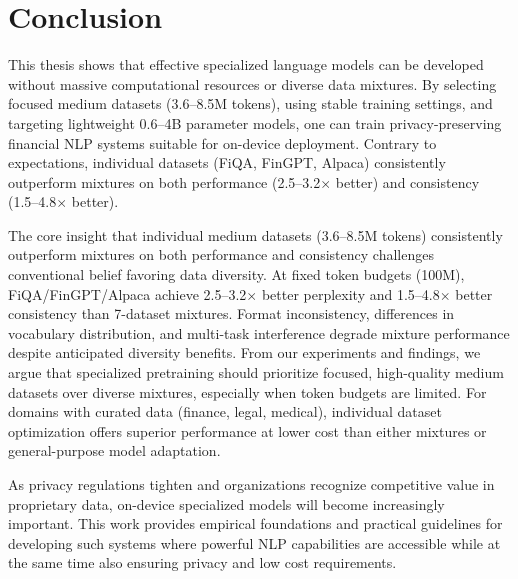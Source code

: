\chapter{Conclusion}


This thesis shows that effective specialized language models can be developed without massive computational resources or diverse data mixtures. By selecting focused medium datasets (3.6–8.5M tokens), using stable training settings, and targeting lightweight 0.6–4B parameter models, one can train privacy-preserving financial NLP systems suitable for on-device deployment. Contrary to expectations, individual datasets (FiQA, FinGPT, Alpaca) consistently outperform mixtures on both performance (2.5–3.2$\times$ better) and consistency (1.5–4.8$\times$ better).

The core insight that {individual medium datasets (3.6–8.5M tokens) consistently outperform mixtures on both performance and consistency} challenges conventional belief favoring data diversity. At fixed token budgets (100M), FiQA/FinGPT/Alpaca achieve 2.5–3.2$\times$ better perplexity and 1.5–4.8$\times$ better consistency than 7-dataset mixtures. Format inconsistency, differences in vocabulary distribution, and multi-task interference degrade mixture performance despite anticipated diversity benefits. From our experiments and findings, we argue that specialized pretraining should prioritize focused, high-quality medium datasets over diverse mixtures, especially when token budgets are limited. For domains with curated data (finance, legal, medical), individual dataset optimization offers superior performance at lower cost than either mixtures or general-purpose model adaptation.

As privacy regulations tighten and organizations recognize competitive value in proprietary data, on-device specialized models will become increasingly important. This work provides empirical foundations and practical guidelines for developing such systems where powerful NLP capabilities are accessible while at the same time also ensuring privacy and low cost requirements.

